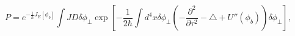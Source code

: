\begin{equation}\label{Amp}P=e^{-\frac{1}{\hbar}J_E[\phi_b]}\int\!
JD\delta\phi _\perp\exp\left[-\frac{1}{2\hbar}\int\!d^4x\delta\phi
_{\perp}\left(-\frac{\partial ^2}{\partial\tau
^2}-\triangle+U''(\phi_b)\right)\delta\phi
_{\perp}\right],\end{equation} 
